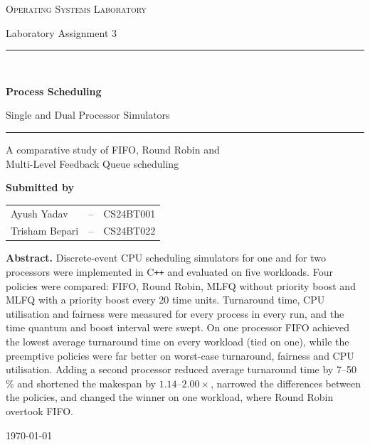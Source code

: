 \documentclass[11pt,a4paper]{article}
\begin{document}
\begin{titlepage}
\centering
\vspace*{1.2cm}

{\large\scshape Operating Systems Laboratory\par}
\vspace{0.3cm}
{\large Laboratory Assignment 3\par}

\vspace{2.4cm}

\rule{\textwidth}{1.2pt}\\[0.55cm]
{\Huge\bfseries Process Scheduling\par}
\vspace{0.35cm}
{\LARGE Single and Dual Processor Simulators\par}
\vspace{0.55cm}
\rule{\textwidth}{1.2pt}

\vspace{1.1cm}

{\large A comparative study of FIFO, Round Robin and\\[1mm]
Multi-Level Feedback Queue scheduling\par}

\vspace{2.6cm}

{\large\bfseries Submitted by\par}
\vspace{0.7cm}
{\large
\begin{tabular}{@{}lcl@{}}
Ayush Yadav       & \quad--\quad & CS24BT001\\[2mm]
Trisham Bepari    & \quad--\quad & CS24BT022\\
\end{tabular}\par}

\vfill

\begin{minipage}{0.88\textwidth}
\small
\noindent\textbf{Abstract.} Discrete-event CPU scheduling simulators for one and for two
processors were implemented in C\texttt{++} and evaluated on five workloads. Four policies
were compared: FIFO, Round Robin, MLFQ without priority boost and MLFQ with a priority
boost every 20 time units. Turnaround time, CPU utilisation and fairness were measured for
every process in every run, and the time quantum and boost interval were swept. On one
processor FIFO achieved the lowest average turnaround time on every workload (tied on one),
while the preemptive policies were far better on worst-case turnaround, fairness and CPU
utilisation. Adding a second processor reduced average turnaround time by 7--50\,\% and
shortened the makespan by $1.14$--$2.00\times$, narrowed the differences between the
policies, and changed the winner on one workload, where Round Robin overtook FIFO.
\end{minipage}

\vspace{1.2cm}
{\large \today\par}
\end{titlepage}
\end{document}
